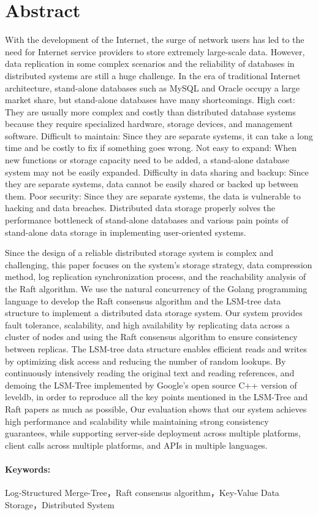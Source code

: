 \section*{Abstract}

With the development of the Internet, the surge of network users has led to the need for Internet service providers to store extremely large-scale data. However, data replication in some complex scenarios and the reliability of databases in distributed systems are still a huge challenge.
In the era of traditional Internet architecture, stand-alone databases such as MySQL and Oracle occupy a large market share, but stand-alone databases have many shortcomings.
High cost: They are usually more complex and costly than distributed database systems because they require specialized hardware, storage devices, and management software.
Difficult to maintain: Since they are separate systems, it can take a long time and be costly to fix if something goes wrong.
Not easy to expand: When new functions or storage capacity need to be added, a stand-alone database system may not be easily expanded.
Difficulty in data sharing and backup: Since they are separate systems, data cannot be easily shared or backed up between them.
Poor security: Since they are separate systems, the data is vulnerable to hacking and data breaches.
Distributed data storage properly solves the performance bottleneck of stand-alone databases and various pain points of stand-alone data storage in implementing user-oriented systems.


Since the design of a reliable distributed storage system is complex and challenging, this paper focuses on the system's storage strategy, data compression method, log replication synchronization process, and the reachability analysis of the Raft algorithm.
We use the natural concurrency of the Golang programming language to develop the Raft consensus algorithm and the LSM-tree data structure to implement a distributed data storage system.
Our system provides fault tolerance, scalability, and high availability by replicating data across a cluster of nodes and using the Raft consensus algorithm to ensure consistency between replicas. The LSM-tree data structure enables efficient reads and writes by optimizing disk access and reducing the number of random lookups.
By continuously intensively reading the original text and reading references, and demoing the LSM-Tree implemented by Google's open source C++ version of leveldb, in order to reproduce all the key points mentioned in the LSM-Tree and Raft papers as much as possible,
Our evaluation shows that our system achieves high performance and scalability while maintaining strong consistency guarantees, while supporting server-side deployment across multiple platforms, client calls across multiple platforms, and APIs in multiple languages.

\paragraph{Keywords: }Log-Structured Merge-Tree，Raft consensus algorithm，Key-Value Data Storage，Distributed System






